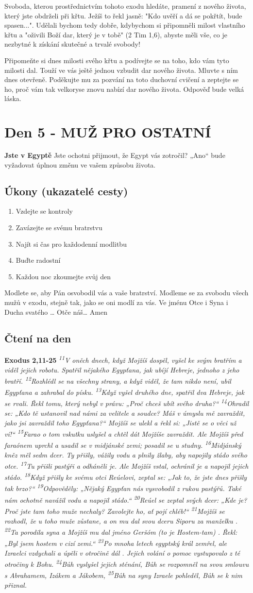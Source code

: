 \documentclass[11pt]{article}
\newcommand{\zacatekPrvniTyden}{
  \textbf{Jste v Egyptě} \newline
  Jste ochotni přijmout, že Egypt vás zotročil? „Ano“ bude vyžadovat úplnou změnu ve vašem způsobu života.

\subsection*{Úkony (ukazatelé cesty)}
\begin{enumerate}
  \item Vzdejte se kontroly
  \item Zavázejte se svému bratrstvu
  \item Najít si čas pro každodenní modlitbu
  \item Buďte radostní
  \item Každou noc zkoumejte svůj den
\end{enumerate}
Modlete se, aby Pán osvobodil vás a vaše bratrství. \newline
Modleme se za svobodu všech mužů v exodu, stejně tak, jako se oni modlí za vás.\newline
Ve jménu Otce i Syna i Ducha svatého …  Otče náš… Amen
}
\begin{document}
Svoboda, kterou prostřednictvím tohoto exodu hledáte, pramení z nového života, který jste obdrželi při křtu.
Ježíš to řekl jasně: "Kdo uvěří a dá se pokřtít, bude spasen...". Udělali bychom tedy dobře, kdybychom si připomněli milost vlastního křtu a "oživili Boží dar, který je v tobě" (2 Tim 1,6), abyste měli vše, co je nezbytné k získání skutečné a trvalé svobody!

Připomeňte si dnes milosti svého křtu a podívejte se na toho, kdo vám tyto milosti dal. Touží ve vás ještě jednou vzbudit dar nového života. Mluvte s ním dnes otevřeně. Poděkujte mu za pozvání na toto duchovní cvičení a zeptejte se ho, proč vám tak velkoryse znovu nabízí dar nového života. Odpověď bude velká láska.

\newpage
\section{Den 5 - MUŽ PRO OSTATNÍ}
\zacatekPrvniTyden
\subsection*{Čtení na den}
\textbf{Exodus 2,11-25}
\newline
\textit{
\textsuperscript{11}V oněch dnech, když Mojžíš dospěl, vyšel ke svým bratřím a viděl jejich robotu. Spatřil nějakého Egypťana, jak ubíjí Hebreje, jednoho z jeho bratří.
\textsuperscript{12}Rozhlédl se na všechny strany, a když viděl, že tam nikdo není, ubil Egypťana a zahrabal do písku.
\textsuperscript{13}Když vyšel druhého dne, spatřil dva Hebreje, jak se rvali. Řekl tomu, který nebyl v právu: „Proč chceš ubít svého druha?“
\textsuperscript{14}Ohradil se: „Kdo tě ustanovil nad námi za velitele a soudce? Máš v úmyslu mě zavraždit, jako jsi zavraždil toho Egypťana?“ Mojžíš se ulekl a řekl si: „Jistě se o věci už ví!“
\textsuperscript{15}Farao o tom vskutku uslyšel a chtěl dát Mojžíše zavraždit. Ale Mojžíš před faraónem uprchl a usadil se v midjánské zemi; posadil se u studny.
\textsuperscript{16}Midjánský kněz měl sedm dcer. Ty přišly, vážily vodu a plnily žlaby, aby napojily stádo svého otce.
\textsuperscript{17}Tu přišli pastýři a odháněli je. Ale Mojžíš vstal, ochránil je a napojil jejich stádo.
\textsuperscript{18}Když přišly ke svému otci Reúelovi, zeptal se: „Jak to, že jste dnes přišly tak brzo?“
\textsuperscript{19}Odpověděly: „Nějaký Egypťan nás vysvobodil z rukou pastýřů. Také nám ochotně navážil vodu a napojil stádo.“
\textsuperscript{20}Reúel se zeptal svých dcer: „Kde je? Proč jste tam toho muže nechaly? Zavolejte ho, ať pojí chléb!“
\textsuperscript{21}Mojžíš se rozhodl, že u toho muže zůstane, a on mu dal svou dceru Siporu za manželku .
\textsuperscript{22}Ta porodila syna a Mojžíš mu dal jméno Geršóm (to je Hostem-tam) . Řekl: „Byl jsem hostem v cizí zemi.“
\textsuperscript{23}Po mnoha letech egyptský král zemřel, ale Izraelci vzdychali a úpěli v otročině dál . Jejich volání o pomoc vystupovalo z té otročiny k Bohu.
\textsuperscript{24}Bůh vyslyšel jejich sténání, Bůh se rozpomněl na svou smlouvu s Abrahamem, Izákem a Jákobem,
\textsuperscript{25}Bůh na syny Izraele pohleděl, Bůh se k nim přiznal.
}
\end{document}
